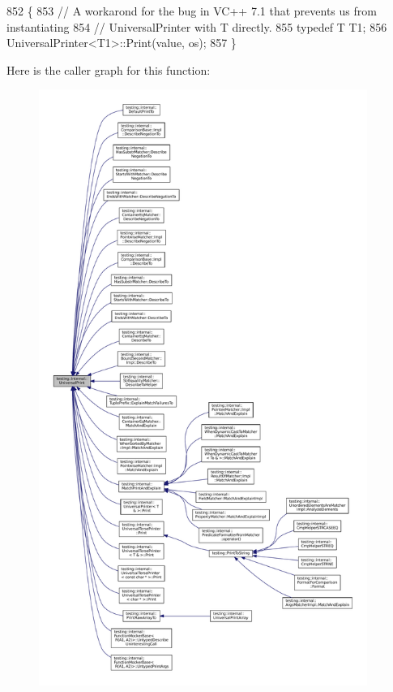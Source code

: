 \begin{DoxyCode}
852                                                     \{
853   \textcolor{comment}{// A workarond for the bug in VC++ 7.1 that prevents us from instantiating}
854   \textcolor{comment}{// UniversalPrinter with T directly.}
855   \textcolor{keyword}{typedef} T T1;
856   UniversalPrinter<T1>::Print(value, os);
857 \}
\end{DoxyCode}
Here is the caller graph for this function\+:
\nopagebreak
\begin{figure}[H]
\begin{center}
\leavevmode
\includegraphics[height=550pt]{namespacetesting_1_1internal_a30708fa2bacf11895b03bdb21eb72309_icgraph}
\end{center}
\end{figure}
\mbox{\label{namespacetesting_1_1internal_a070107e7a8205ad6ec4d538d52b15b38}} 
